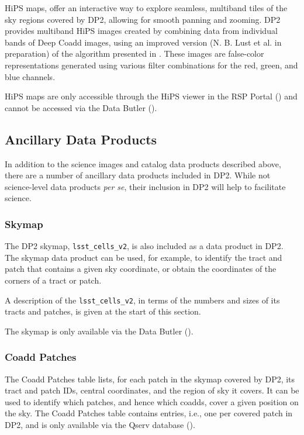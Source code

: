 \gls{HiPS} maps, offer an interactive way to explore seamless, multiband tiles of the sky regions covered by \gls{DP2}, allowing for smooth panning and zooming.
DP2 provides multiband \gls{HiPS} images created by combining data from individual bands of Deep Coadd images, using an improved version (N.
B.
Lust et al. in preparation) of the algorithm presented in \cite[][]{2004PASP..116..133L}.
These images are false-color representations generated using various filter combinations for the red, green, and blue channels.

\gls{HiPS} maps are only accessible through the \gls{HiPS} viewer in the \gls{RSP} Portal () and cannot be accessed via the Data \gls{Butler} ().


\subsection{Ancillary Data Products}
In addition to the science images and catalog data products described above, there are a number of ancillary data products included in \gls{DP2}.
While not science-level data products \textit{per se}, their inclusion in \gls{DP2} will help to facilitate science.

\subsubsection{Skymap}
The \gls{DP2} skymap, \texttt{lsst\_cells\_v2}, is also included as a data product in \gls{DP2}.
The skymap data product can be used, for example, to identify the tract and \gls{patch} that contains a given sky coordinate, or obtain the coordinates of the corners of a tract or \gls{patch}.

A description of the \texttt{lsst\_cells\_v2}, in terms of the numbers and sizes of its tracts and patches, is given at the start of this section.

The skymap is only available via the Data \gls{Butler} ().

\subsubsection{Coadd Patches}
The Coadd Patches table lists, for each \gls{patch} in the skymap covered by \gls{DP2}, its \gls{tract} and \gls{patch} IDs, central coordinates, and the region of sky it covers.
It can be used to identify which patches, and hence which coadds, cover a given position on the sky.
The Coadd Patches table contains \ncoaddpatchesrows entries, i.e., one per covered patch in DP2, and is only available via the Qserv database ().

